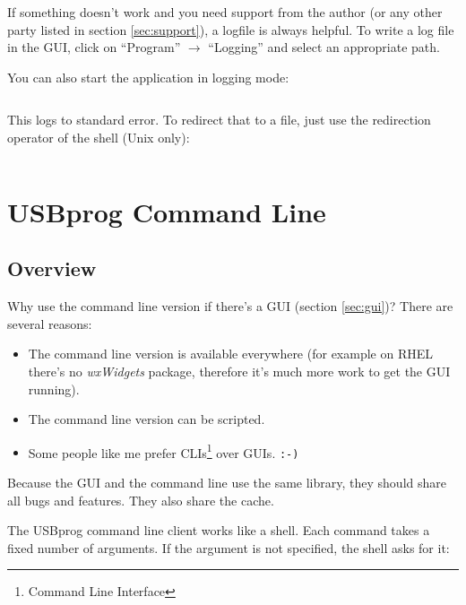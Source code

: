 \documentclass[bibtotoc,UKenglish,halfparskip,oneside,DIV12]{scrreprt}
\begin{document}
If something doesn't work and you need support from the author (or any other party listed in section
\vref{sec:support}), a logfile is always helpful. To write a log file in the GUI, click on
``Program'' $\rightarrow$ ``Logging'' and select an appropriate path.

You can also start the application in logging mode:

\begin{lstlisting}[style=inline]
% usbprog-gui -D
\end{lstlisting}

This logs to standard error. To redirect that to a file, just use the redirection operator of the
shell (Unix only):

\begin{lstlisting}[style=inline]
% usbprog-gui -D 2> /path/to/logfile.log
\end{lstlisting}



\section{USBprog Command Line}
\label{sec:cli}

\subsection{Overview}

Why use the command line version if there's a GUI (section \vref{sec:gui})? There are several
reasons:

\begin{itemize}
  \item The command line version is available everywhere (for example on RHEL there's no
    \emph{wxWidgets} package, therefore it's much more work to get the GUI running).

  \item The command line version can be scripted.

  \item Some people like me prefer CLIs\footnote{Command Line Interface} over GUIs. \texttt{:-)}
\end{itemize}

Because the GUI and the command line use the same library, they should share all bugs and features.
They also share the cache.

The USBprog command line client works like a shell. Each command takes a fixed number of arguments.
If the argument is not specified, the shell asks for it:
\end{document}
